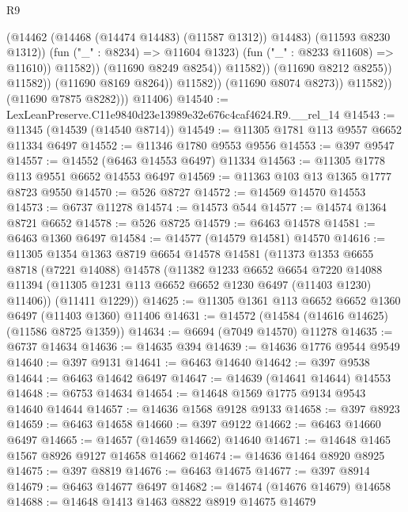 \begin{lexlean}{R9}
\begin{coremodule}
                                          (@14462 (@14468 (@14474 @14483) (@11587 @1312)) @14483)
                                          (@11593 @8230 @1312))
                                        (fun ("_" : @8234) => @11604 @1323)
                                        (fun ("_" : @8233 @11608) => @11610))
                                      @11582))
                                  (@11690 @8249 @8254))
                                @11582))
                            (@11690 @8212 @8255))
                          @11582))
                      (@11690 @8169 @8264))
                    @11582))
                (@11690 @8074 @8273))
              @11582))
          (@11690 @7875 @8282)))
      @11406)
@14540 := LexLeanPreserve.C11e9840d23e13989e32e676c4caf4624.R9.__rel_14
@14543 := @11345 (@14539 (@14540 @8714))
@14549 := @11305 @1781 @113 @9557 @6652 @11334 @6497
@14552 := @11346 @1780 @9553 @9556
@14553 := @397 @9547
@14557 := @14552 (@6463 @14553 @6497) @11334
@14563 := @11305 @1778 @113 @9551 @6652 @14553 @6497
@14569 := @11363 @103 @13 @1365 @1777 @8723 @9550
@14570 := @526 @8727
@14572 := @14569 @14570 @14553
@14573 := @6737 @11278
@14574 := @14573 @544
@14577 := @14574 @1364 @8721 @6652
@14578 := @526 @8725
@14579 := @6463 @14578
@14581 := @6463 @1360 @6497
@14584 := @14577 (@14579 @14581) @14570
@14616 := @11305
    @1354
    @1363
    @8719
    @6654
    @14578
    @14581
    (@11373
      @1353
      @6655
      @8718
      (@7221 @14088)
      @14578
      (@11382
        @1233
        @6652
        @6654
        @7220
        @14088
        @11394
        (@11305 @1231 @113 @6652 @6652 @1230 @6497 (@11403 @1230) @11406))
      (@11411 @1229))
@14625 := @11305 @1361 @113 @6652 @6652 @1360 @6497 (@11403 @1360) @11406
@14631 := @14572 (@14584 (@14616 @14625) (@11586 @8725 @1359))
@14634 := @6694 (@7049 @14570) @11278
@14635 := @6737 @14634
@14636 := @14635 @394
@14639 := @14636 @1776 @9544 @9549
@14640 := @397 @9131
@14641 := @6463 @14640
@14642 := @397 @9538
@14644 := @6463 @14642 @6497
@14647 := @14639 (@14641 @14644) @14553
@14648 := @6753 @14634
@14654 := @14648 @1569 @1775 @9134 @9543 @14640 @14644
@14657 := @14636 @1568 @9128 @9133
@14658 := @397 @8923
@14659 := @6463 @14658
@14660 := @397 @9122
@14662 := @6463 @14660 @6497
@14665 := @14657 (@14659 @14662) @14640
@14671 := @14648 @1465 @1567 @8926 @9127 @14658 @14662
@14674 := @14636 @1464 @8920 @8925
@14675 := @397 @8819
@14676 := @6463 @14675
@14677 := @397 @8914
@14679 := @6463 @14677 @6497
@14682 := @14674 (@14676 @14679) @14658
@14688 := @14648 @1413 @1463 @8822 @8919 @14675 @14679

\end{coremodule}
\end{lexlean}
